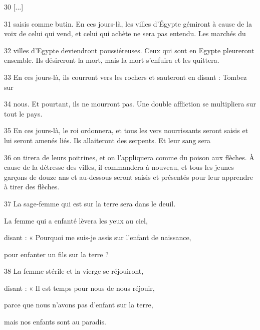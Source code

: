 \par 30 [...]

\par 31 saisis comme butin. En ces jours-là, les villes d'Égypte gémiront à cause de la voix de celui qui vend, et celui qui achète ne sera pas entendu. Les marchés du

\par 32 villes d'Egypte deviendront poussiéreuses. Ceux qui sont en Egypte pleureront ensemble. Ils désireront la mort, mais la mort s'enfuira et les quittera.

\par 33 En ces jours-là, ils courront vers les rochers et sauteront en disant : Tombez sur

\par 34 nous. Et pourtant, ils ne mourront pas. Une double affliction se multipliera sur tout le pays.

\par 35 En ces jours-là, le roi ordonnera, et tous les vers nourrissants seront saisis et lui seront amenés liés. Ils allaiteront des serpents. Et leur sang sera

\par 36 on tirera de leurs poitrines, et on l'appliquera comme du poison aux flèches. À cause de la détresse des villes, il commandera à nouveau, et tous les jeunes garçons de douze ans et au-dessous seront saisis et présentés pour leur apprendre à tirer des flèches.

\par 37 La sage-femme qui est sur la terre sera dans le deuil.

\par La femme qui a enfanté lèvera les yeux au ciel,

\par disant : « Pourquoi me suis-je assis sur l'enfant de naissance,

\par pour enfanter un fils sur la terre ?

\par 38 La femme stérile et la vierge se réjouiront,

\par disant : « Il est temps pour nous de nous réjouir,

\par parce que nous n'avons pas d'enfant sur la terre,

\par mais nos enfants sont au paradis.


